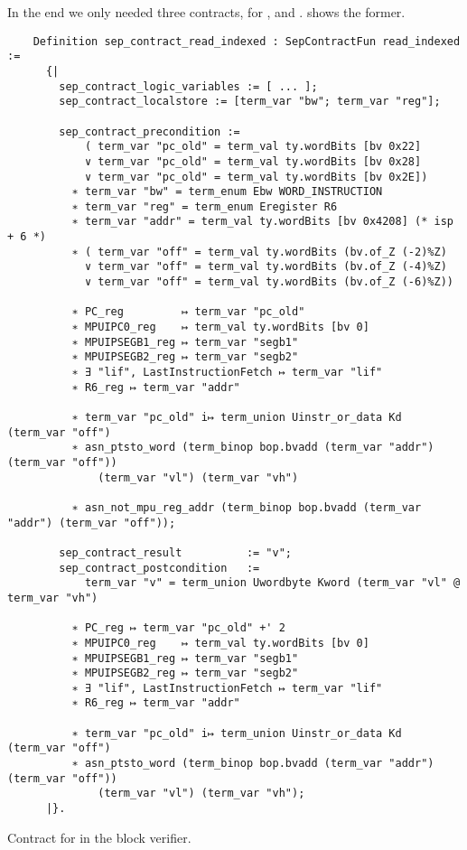 In the end we only needed three contracts, for ,  and .  shows the former.

\begin{listing}
  \begin{verbatim}
    Definition sep_contract_read_indexed : SepContractFun read_indexed :=
      {|
        sep_contract_logic_variables := [ ... ];
        sep_contract_localstore := [term_var "bw"; term_var "reg"];

        sep_contract_precondition :=
            ( term_var "pc_old" = term_val ty.wordBits [bv 0x22]
            ∨ term_var "pc_old" = term_val ty.wordBits [bv 0x28]
            ∨ term_var "pc_old" = term_val ty.wordBits [bv 0x2E])
          ∗ term_var "bw" = term_enum Ebw WORD_INSTRUCTION
          ∗ term_var "reg" = term_enum Eregister R6
          ∗ term_var "addr" = term_val ty.wordBits [bv 0x4208] (* isp + 6 *)
          ∗ ( term_var "off" = term_val ty.wordBits (bv.of_Z (-2)%Z)
            ∨ term_var "off" = term_val ty.wordBits (bv.of_Z (-4)%Z)
            ∨ term_var "off" = term_val ty.wordBits (bv.of_Z (-6)%Z))

          ∗ PC_reg         ↦ term_var "pc_old"
          ∗ MPUIPC0_reg    ↦ term_val ty.wordBits [bv 0]
          ∗ MPUIPSEGB1_reg ↦ term_var "segb1"
          ∗ MPUIPSEGB2_reg ↦ term_var "segb2"
          ∗ ∃ "lif", LastInstructionFetch ↦ term_var "lif"
          ∗ R6_reg ↦ term_var "addr"

          ∗ term_var "pc_old" i↦ term_union Uinstr_or_data Kd (term_var "off")
          ∗ asn_ptsto_word (term_binop bop.bvadd (term_var "addr") (term_var "off"))
              (term_var "vl") (term_var "vh")

          ∗ asn_not_mpu_reg_addr (term_binop bop.bvadd (term_var "addr") (term_var "off"));

        sep_contract_result          := "v";
        sep_contract_postcondition   :=
            term_var "v" = term_union Uwordbyte Kword (term_var "vl" @ term_var "vh")

          ∗ PC_reg ↦ term_var "pc_old" +' 2
          ∗ MPUIPC0_reg    ↦ term_val ty.wordBits [bv 0]
          ∗ MPUIPSEGB1_reg ↦ term_var "segb1"
          ∗ MPUIPSEGB2_reg ↦ term_var "segb2"
          ∗ ∃ "lif", LastInstructionFetch ↦ term_var "lif"
          ∗ R6_reg ↦ term_var "addr"

          ∗ term_var "pc_old" i↦ term_union Uinstr_or_data Kd (term_var "off")
          ∗ asn_ptsto_word (term_binop bop.bvadd (term_var "addr") (term_var "off"))
              (term_var "vl") (term_var "vh");
      |}.
  \end{verbatim}
  \caption{Contract for  in the block verifier.}
  \label{lst:bv-read_indexed}
\end{listing}

